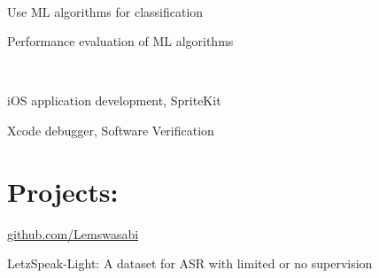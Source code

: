 \documentclass[]{curriculumvitae}
\begin{document}
\begin{minipage}[t]{0.65\textwidth}
 \\
\vspace{0.9em}
\begin{tightemize}
	\item Use ML algorithms for classification
	\item Performance evaluation of ML algorithms
\end{tightemize}
\sectionsep

 \\
\vspace{0.9em}
\begin{tightemize}
\item iOS application development, SpriteKit
\item Xcode debugger, Software Verification
\end{tightemize}
\sectionsep

\section{Projects:}

\faGithub \hspace{1em} \href{https://github.com/Lemswasabi}{github.com/Lemswasabi}
\begin{tightemize}
	\item LetzSpeak-Light: A dataset for ASR with limited or no supervision
\end{tightemize}

\end{minipage} 
\end{document}
